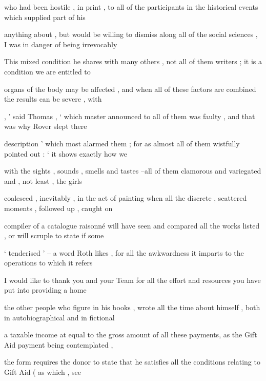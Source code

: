 \documentclass[11pt,a4paper]{article}
\begin{document}
\begin{examples}
\item
\begin{examples}
\item who had been hostile , in print , to all of the participants in the historical events which supplied part of his 
\item anything about , but would be willing to dismiss along all of the social sciences , I was in danger of being irrevocably 
\item This mixed condition he shares with many others , not all of them writers ; it is a condition we are entitled to 
\item organs of the body may be affected , and when all of these factors are combined the results can be severe , with 
\item , ' said Thomas , ` which master announced to all of them was faulty , and that was why Rover slept there 
\item description ' which most alarmed them ; for as almost all of them wistfully pointed out : ` it shows exactly how we 
\item with the sights , sounds , smells and tastes --all of them clamorous and variegated and , not least , the girls 
\end{examples}

\item
\begin{examples}
\item coalesced , inevitably , in the act of painting when all the discrete , scattered moments , followed up , caught on 
\item compiler of a catalogue raisonn\'{e} will have seen and compared all the works listed , or will scruple to state if some 
\item ` tenderised ' -- a word Roth likes , for all the awkwardness it imparts to the operations to which it refers 
\item I would like to thank you and your Team for all the effort and resources you have put into providing a home 
\item the other people who figure in his books , wrote all the time about himself , both in autobiographical and in fictional 
\item a taxable income at equal to the gross amount of all these payments, as the Gift Aid payment being contemplated , 
\item the form requires the donor to state that he satisfies all the conditions relating to Gift Aid ( as which , see 
\end{examples}


\end{examples}
\end{document}

